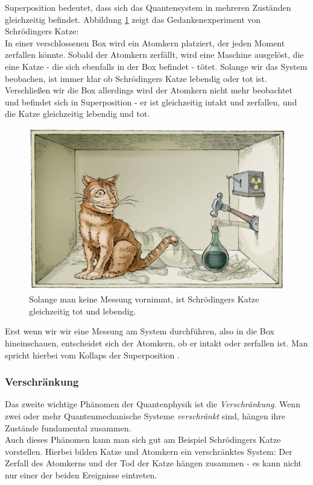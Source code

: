 \documentclass[12pt]{article}
\begin{document}
Superposition bedeutet, dass sich das Quantensystem in mehreren Zuständen gleichzeitig befindet. Abbildung \ref{fig:Schrödinger} zeigt das Gedankenexperiment von Schrödingers Katze: \\
In einer verschlossenen Box wird ein Atomkern platziert, der jeden Moment zerfallen könnte. Sobald der Atomkern zerfällt, wird eine Maschine ausgelöst, die eine Katze - die sich ebenfalls in der Box befindet - tötet. Solange wir das System beobachen, ist immer klar ob Schrödingers Katze lebendig oder tot ist. Verschließen wir die Box allerdings wird der Atomkern nicht mehr beobachtet und befindet sich in Superposition - er ist gleichzeitig intakt und zerfallen, und die Katze gleichzeitig lebendig und tot. \cite{ImgSchrodinger}

\begin{figure}[h]
    \centering
    \includegraphics[width=0.7\linewidth]{PICS/Schrodinger.jpg}
    \caption{Solange man keine Messung vornimmt, ist Schrödingers Katze gleichzeitig tot und lebendig. \cite{ImgSchrodinger}}
    \label{fig:Schrödinger}
\end{figure}

Erst wenn wir wir eine Messung am System durchführen, also in die Box hineinschauen, entscheidet sich der Atomkern, ob er intakt oder zerfallen ist. Man spricht hierbei vom Kollaps der Superposition \cite{KollapsWiki}.

\subsubsection{Verschränkung}

Das zweite wichtige Phänomen der Quantenphysik ist die \textit{Verschränkung}. Wenn zwei oder mehr Quantenmechanische Systeme \textit{verschränkt} sind, hängen ihre Zustände fundamental zusammen. \cite{mavroeidis2018impact} \\
Auch dieses Phänomen kann man sich gut am Beispiel Schrödingers Katze vorstellen. Hierbei bilden Katze und Atomkern ein verschränktes System: Der Zerfall des Atomkerns und der Tod der Katze hängen zusammen - es kann nicht nur einer der beiden Ereignisse eintreten. \\
\end{document}
